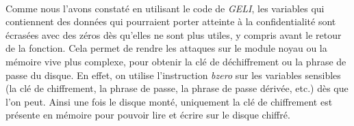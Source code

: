 \paragraph{}
Comme nous l'avons constaté en utilisant le code de {\em GELI}, les variables
qui contiennent des données qui pourraient porter atteinte à la confidentialité
sont écrasées avec des zéros dès qu'elles ne sont plus utiles, y compris avant
le retour de la fonction. Cela permet de rendre les attaques sur le module
noyau ou la mémoire vive plus complexe, pour obtenir la clé de déchiffrement ou
la phrase de passe du disque. En effet, on utilise l'instruction {\em bzero}
sur les variables sensibles (la clé de chiffrement, la phrase de passe, la
phrase de passe dérivée, etc.) dès que l'on peut. Ainsi une fois le disque
monté, uniquement la clé de chiffrement est présente en mémoire pour pouvoir
lire et écrire sur le disque chiffré.
